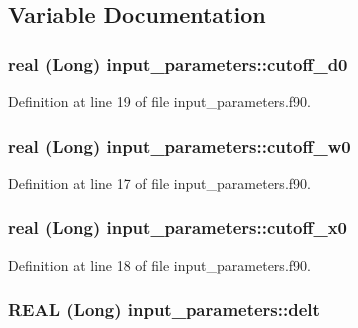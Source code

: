 \subsection{Variable Documentation}
\hypertarget{namespaceinput__parameters_a8e63bceb853ebd1124eda12568a0e57f}{
\subsubsection[{cutoff\_\-d0}]{\setlength{\rightskip}{0pt plus 5cm}real (Long) {\bf input\_\-parameters::cutoff\_\-d0}}}
\label{namespaceinput__parameters_a8e63bceb853ebd1124eda12568a0e57f}


Definition at line 19 of file input\_\-parameters.f90.

\hypertarget{namespaceinput__parameters_a3987174aef89a10227220b4e5bdecde6}{
\subsubsection[{cutoff\_\-w0}]{\setlength{\rightskip}{0pt plus 5cm}real (Long) {\bf input\_\-parameters::cutoff\_\-w0}}}
\label{namespaceinput__parameters_a3987174aef89a10227220b4e5bdecde6}


Definition at line 17 of file input\_\-parameters.f90.

\hypertarget{namespaceinput__parameters_a87f2d307b48a20f985ea0692b9dfebf6}{
\subsubsection[{cutoff\_\-x0}]{\setlength{\rightskip}{0pt plus 5cm}real (Long) {\bf input\_\-parameters::cutoff\_\-x0}}}
\label{namespaceinput__parameters_a87f2d307b48a20f985ea0692b9dfebf6}


Definition at line 18 of file input\_\-parameters.f90.

\hypertarget{namespaceinput__parameters_a42efff37bd453975f48e8485e5757acd}{
\subsubsection[{delt}]{\setlength{\rightskip}{0pt plus 5cm}REAL (Long) {\bf input\_\-parameters::delt}}}
\label{namespaceinput__parameters_a42efff37bd453975f48e8485e5757acd}


